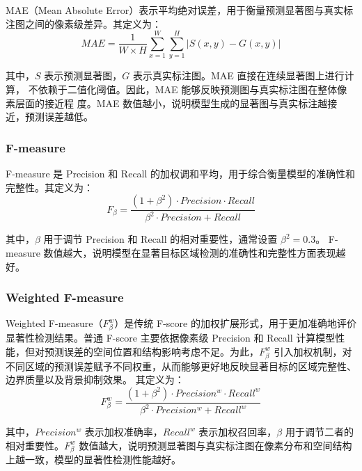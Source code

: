 \documentclass[UTF8,a4paper,10pt]{ctexart}
\begin{document}
MAE（Mean Absolute Error）表示平均绝对误差，用于衡量预测显著图与真实标注图之间的像素级差异。其定义为：
\begin{equation*}
  MAE=\frac{1}{W\times H}\sum_{x=1}^W\sum_{y=1}^H|S(x,y)-G(x,y)|
\end{equation*}

其中，$S$ 表示预测显著图，$G$ 表示真实标注图。MAE 直接在连续显著图上进行计算，
不依赖于二值化阈值。因此，MAE 能够反映预测图与真实标注图在整体像素层面的接近程
度。MAE 数值越小，说明模型生成的显著图与真实标注越接近，预测误差越低。

\subsubsection{F-measure}

F-measure 是 Precision 和 Recall 的加权调和平均，用于综合衡量模型的准确性和完整性。其定义为：
\begin{equation*}
  F_{\beta}=\frac{(1+\beta^2)\cdot Precision \cdot Recall}{\beta^2\cdot Precision + Recall}
\end{equation*}

其中，$\beta$ 用于调节 Precision 和 Recall 的相对重要性，通常设置 $\beta^2=0.3$。
F-measure 数值越大，说明模型在显著目标区域检测的准确性和完整性方面表现越好。

\subsubsection{Weighted F-measure}

Weighted F-measure（$F_{\beta}^{w}$）是传统 F-score 的加权扩展形式，用于更加准确地评价显著性检测结果。普通 F-score 主要依据像素级 Precision 和 Recall 计算模型性能，但对预测误差的空间位置和结构影响考虑不足。为此，$F_{\beta}^{w}$ 引入加权机制，对不同区域的预测误差赋予不同权重，从而能够更好地反映显著目标的区域完整性、边界质量以及背景抑制效果。
其定义为：
\begin{equation*}
  F_{\beta}^{w}
  =
  \frac{(1+\beta^2)\cdot Precision^{w}\cdot Recall^{w}}
  {\beta^2\cdot Precision^{w}+Recall^{w}}
\end{equation*}

其中，$Precision^{w}$ 表示加权准确率，$Recall^{w}$ 表示加权召回率，$\beta$ 用于调节二者的相对重要性。$F_{\beta}^{w}$ 数值越大，说明预测显著图与真实标注图在像素分布和空间结构上越一致，模型的显著性检测性能越好。
\end{document}
